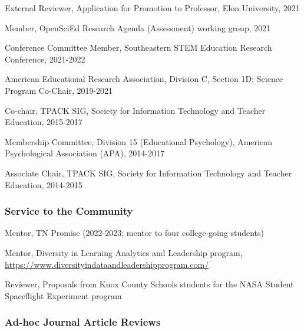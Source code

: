 \documentclass[
  14,
]{article}
\begin{document}
External Reviewer, Application for Promotion to Professor, Elon
University, 2021

Member, OpenSciEd Research Agenda (Assessment) working group, 2021

Conference Committee Member, Southeastern STEM Education Research
Conference, 2021-2022

American Educational Research Association, Division C, Section 1D:
Science Program Co-Chair, 2019-2021

Co-chair, TPACK SIG, Society for Information Technology and Teacher
Education, 2015-2017

Membership Committee, Division 15 (Educational Psychology), American
Psychological Association (APA), 2014-2017

Associate Chair, TPACK SIG, Society for Information Technology and
Teacher Education, 2014-2015

\hypertarget{service-to-the-community}{%
\subsubsection{Service to the
Community}\label{service-to-the-community}}

Mentor, TN Promise (2022-2023; mentor to four college-going students)

Mentor, Diversity in Learning Analytics and Leadership program,
\url{https://www.diversityindataandleadershipprogram.com/}

Reviewer, Proposals from Knox County Schools students for the NASA
Student Spaceflight Experiment program

\hypertarget{ad-hoc-journal-article-reviews}{%
\subsubsection{Ad-hoc Journal Article
Reviews}\label{ad-hoc-journal-article-reviews}}
\end{document}
